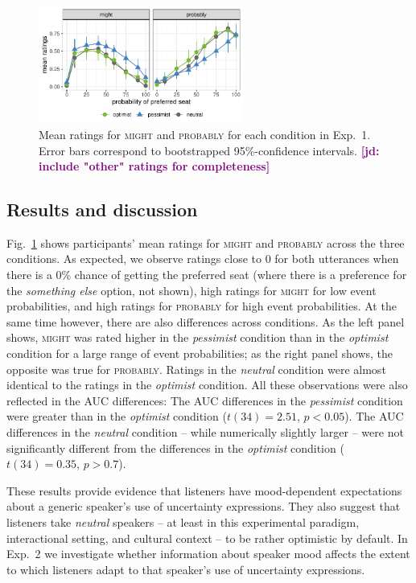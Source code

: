 \documentclass[man,floatsintext]{apa6}
\newcommand{\jd}[1]{\textcolor{Purple}{\bf [jd: #1]}}
\begin{document}
\begin{figure}[t]
    \centering
    \includegraphics[width=0.6\textwidth]{norming.pdf}
    \caption{Mean ratings for \textsc{might} and \textsc{probably} for each condition in Exp.~1. Error bars correspond to bootstrapped 95\%-confidence intervals. \jd{include "other" ratings for completeness}}
    \label{fig:results-exp1}
\end{figure}

\subsection{Results and discussion}

Fig.~\ref{fig:results-exp1} shows participants' mean ratings for \textsc{might} and \textsc{probably} across the three conditions. As expected, we observe ratings close to 0 for both utterances when there is a 0\% chance of getting the preferred seat (where there is a preference for the \textit{something else} option, not shown), high ratings for \textsc{might} for low event probabilities, and high ratings for \textsc{probably} for high event probabilities. At the same time however, there are also differences across conditions. As the left panel shows, \textsc{might} was rated higher in the \textit{pessimist} condition than in the \textit{optimist} condition for a large range of event probabilities; as the right panel shows, the opposite was true for \textsc{probably}. Ratings in the \textit{neutral} condition were almost identical to the ratings in the \textit{optimist} condition. All these observations were also reflected in the AUC differences: The AUC differences in the \textit{pessimist} condition were greater than in the \textit{optimist} condition ($t(34)=2.51$, $p < 0.05$). The AUC differences in the \textit{neutral} condition -- while numerically slightly larger -- were not significantly different from the differences in the \textit{optimist} condition ($t(34)=0.35$, $p>0.7$).

These results provide evidence that listeners have mood-dependent expectations about a generic speaker's use of uncertainty expressions. They also suggest that listeners take \emph{neutral} speakers -- at least in this experimental paradigm, interactional setting, and cultural context -- to  be rather optimistic by default. In Exp.~2 we investigate whether information about speaker mood affects the extent to which listeners adapt to that speaker's use of uncertainty expressions.  %
\end{document}
